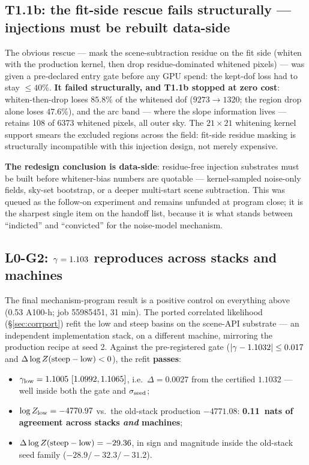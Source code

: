 \subsection{T1.1b: the fit-side rescue fails structurally --- injections
            must be rebuilt data-side}
\label{sec:t11b}

The obvious rescue --- mask the scene-subtraction residue on the fit side
(whiten with the production kernel, then drop residue-dominated whitened
pixels) --- was given a pre-declared entry gate before any GPU spend: the
kept-dof loss had to stay $\le40\%$. \textbf{It failed structurally, and
T1.1b stopped at zero cost}: whiten-then-drop loses $85.8\%$ of the
whitened dof ($9273\to1320$; the region drop alone loses $47.6\%$), and the
arc band --- where the slope information lives --- retains 108 of 6373
whitened pixels, all outer sky.
The $21\times21$ whitening kernel support smears the excluded regions across
the field: fit-side residue masking is structurally incompatible with this
injection design, not merely expensive.

\textbf{The redesign conclusion is data-side}: residue-free injection
substrates must be built before whitener-bias numbers are quotable ---
kernel-sampled noise-only fields, sky-set bootstrap, or a deeper
multi-start scene subtraction. This was queued as the follow-on experiment
and remains unfunded at program close; it is the sharpest single item on
the handoff list, because it is what stands between ``indicted'' and
``convicted'' for the noise-model mechanism.

\subsection{L0-G2: $\gamma=1.103$ reproduces across stacks and machines}
\label{sec:l0g2}

The final mechanism-program result is a positive control on everything
above (0.53 A100-h; job 55985451, 31 min). The ported correlated likelihood
(\S\ref{sec:corrport}) refit the  low and steep basins on the
scene-API substrate --- an independent implementation stack, on a different
machine, mirroring the production recipe at seed 2. Against the
pre-registered gate ($|\gamma-1.1032|\le0.017$ and
$\Delta\log Z({\rm steep}-{\rm low})<0$), the refit
\textbf{passes}:

\begin{itemize}
\item $\gamma_{\rm low} = 1.1005\ [1.0992, 1.1065]$, i.e.\
$\Delta=0.0027$ from the certified $1.1032$ --- well inside both the gate
and $\sigma_{\rm seed}$;
\item $\log Z_{\rm low} = -4770.97$ vs.\ the old-stack production
$-4771.08$: \textbf{0.11~nats of agreement across stacks \emph{and}
machines};
\item $\Delta\log Z({\rm steep}-{\rm low}) = -29.36$, in sign and magnitude
inside the old-stack seed family ($-28.9/-32.3/-31.2$).
\end{itemize}

